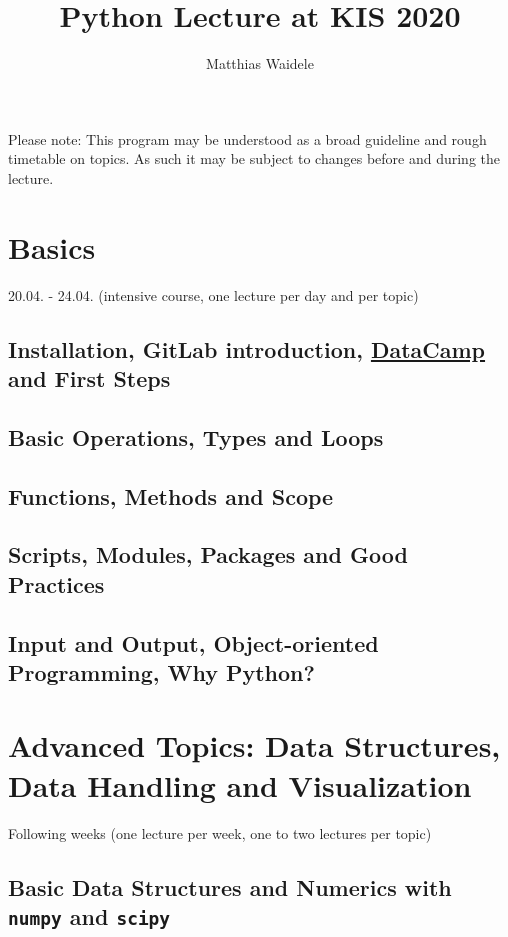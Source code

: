 \documentclass[10pt,a4paper]{article}
\begin{document}
	\title{Python Lecture at KIS 2020}
	\author{Matthias Waidele}
	\date{}
	
	\maketitle
	Please note: This program may be understood as a broad guideline and rough timetable on topics. As such it may be subject to changes before and during the lecture.
	
	\section{Basics}
	20.04. - 24.04. (intensive course, one lecture per day and per topic)
	
		\subsection{Installation, GitLab introduction, \href{https://learn.datacamp.com/}{DataCamp} and First Steps}
		\subsection{Basic Operations, Types and Loops}
		\subsection{Functions, Methods and Scope}
		\subsection{Scripts, Modules, Packages and Good Practices}
		\subsection{Input and Output, Object-oriented Programming, Why Python?}
	
	\vspace{1cm}
	\section{Advanced Topics: Data Structures, Data Handling and Visualization}
	Following weeks (one lecture per week, one to two lectures per topic)
		
		\subsection{Basic Data Structures and Numerics with \texttt{numpy} and \texttt{scipy}}
\end{document}
